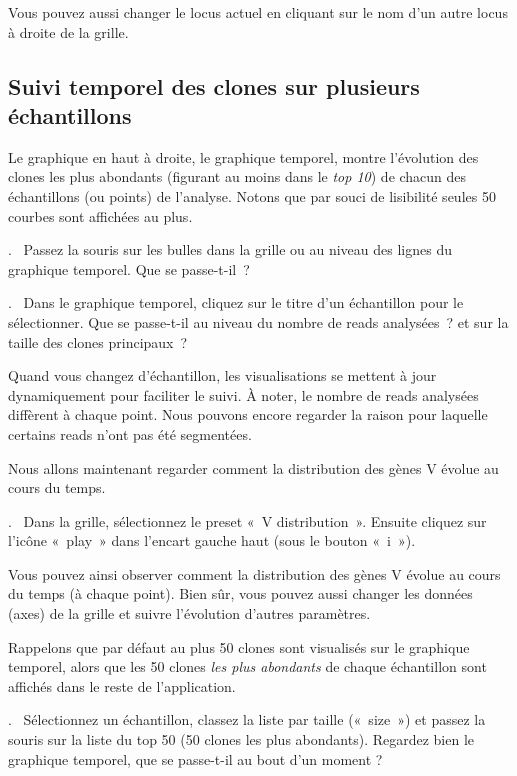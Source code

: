 \documentclass[11pt]{article}
\newcounter{questionum}
\newcommand\com[1]{\textsf{«~#1~»}}
\newcommand\question[1]{\par\noindent\textbf{\thequestionum}.~#1\addtocounter{questionum}{1}}
\begin{document}
Vous pouvez aussi changer le locus actuel en cliquant sur le nom d'un
autre locus à droite de la grille.

\subsection{Suivi temporel des clones sur plusieurs échantillons}

Le graphique en haut à droite, le graphique temporel, montre l'évolution des
clones les plus abondants (figurant au moins dans le \textit{top 10}) de chacun des
échantillons (ou points) de l'analyse.
Notons que par souci de lisibilité seules 50 courbes sont affichées au plus.

\question{%
  Passez la souris sur les bulles dans la grille ou au niveau des lignes
  du graphique temporel. Que se passe-t-il~?}
\question{
  Dans le graphique temporel, cliquez sur le titre d'un échantillon pour le
  sélectionner. Que se passe-t-il au niveau du nombre de reads
  analysées~? et sur la taille des clones principaux~?}

Quand vous changez d'échantillon, les visualisations se mettent à jour
dynamiquement pour faciliter le suivi. À noter, le nombre de reads
analysées diffèrent à chaque point. Nous pouvons encore
regarder la raison pour laquelle certains reads n'ont pas été segmentées.

\bigskip

Nous allons maintenant regarder comment la distribution des gènes V évolue
au cours du temps.

\question{%
  Dans la grille, sélectionnez le preset \com{V distribution}. Ensuite
  cliquez sur l'icône \com{play} dans l'encart gauche haut (sous le
  bouton «~i~»).}

Vous pouvez ainsi observer comment la distribution des gènes V
évolue au cours du temps (à chaque point). Bien sûr, vous pouvez aussi
changer les données (axes) de la grille et suivre l'évolution
d'autres paramètres.

\bigskip

Rappelons que par défaut au plus 50 clones sont visualisés sur le graphique
temporel, alors que les 50 clones \textit{les plus abondants} de chaque échantillon
sont affichés dans le reste de l'application.

\question{%
  Sélectionnez un échantillon, classez la liste par taille (\com{size}) et passez la
  souris sur la liste du top 50 (50 clones les plus abondants). Regardez bien
  le graphique temporel, que se passe-t-il au bout d'un moment ?}
\end{document}
